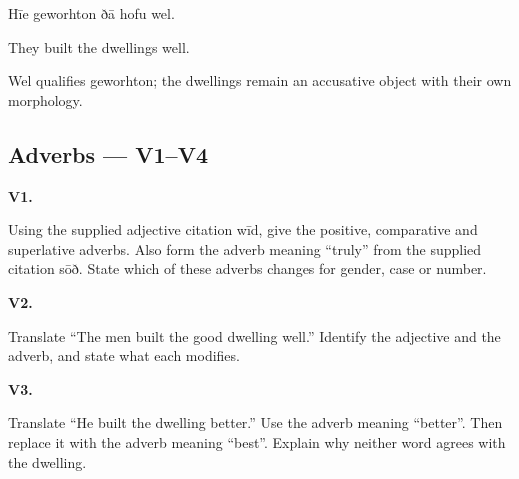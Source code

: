 Hīe geworhton ðā hofu wel.

They built the dwellings well.

Wel qualifies geworhton; the dwellings remain an accusative object with their own morphology.

\subsection*{Adverbs — V1–V4}

\par\begin{minipage}{\linewidth}\raggedright
\textbf{V1.}

Using the supplied adjective citation wīd, give the positive, comparative and superlative adverbs. Also form the adverb meaning “truly” from the supplied citation sōð. State which of these adverbs changes for gender, case or number.

\end{minipage}\par\addvspace{4pt}

\par\begin{minipage}{\linewidth}\raggedright
\textbf{V2.}

Translate “The men built the good dwelling well.” Identify the adjective and the adverb, and state what each modifies.

\end{minipage}\par\addvspace{4pt}

\par\begin{minipage}{\linewidth}\raggedright
\textbf{V3.}

Translate “He built the dwelling better.” Use the adverb meaning “better”. Then replace it with the adverb meaning “best”. Explain why neither word agrees with the dwelling.

\end{minipage}\par\addvspace{4pt}

